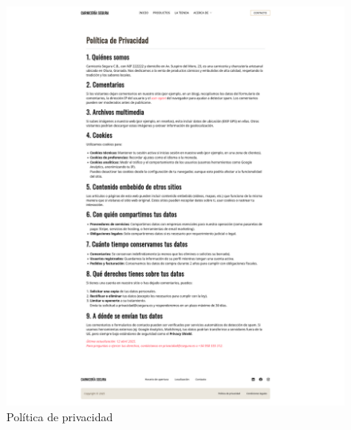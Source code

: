 \documentclass[a4paper]{article}
\begin{document}
\begin{figure}[H]
    \centering
    \includegraphics[width=1\textwidth]{images/privacy-policy.png}
    \caption{Política de privacidad}
\end{figure}
\end{document}
